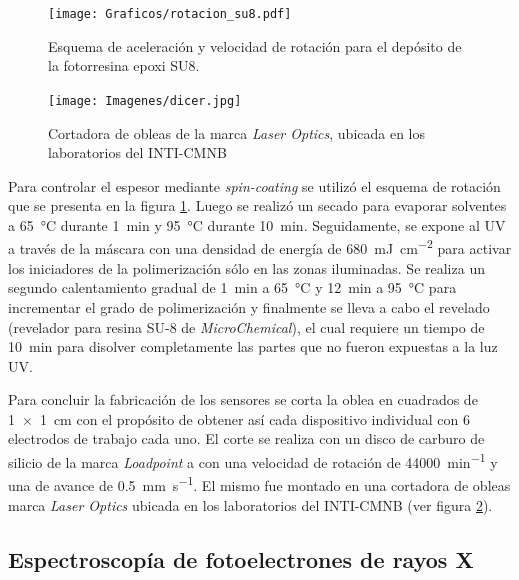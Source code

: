 					\begin{figure}[hb!]
			 		  \begin{center}
			 		  \texttt{[image: Graficos/rotacion\_su8.pdf]}
			 		  \caption[Parámetros de depósito para la resina epoxi]{Esquema de aceleración y velocidad de rotación para el depósito de la fotorresina epoxi SU8.}
			 		  \label{fig:spin-su8}
			 		  \vspace*{-2mm}
			 		  \end{center}
			 		  \end{figure}

			 		  \begin{figure}[bh!]
			 		  \begin{center}
			 		  \texttt{[image: Imagenes/dicer.jpg]}
			 		  \caption[Cortadora de obleas]{Cortadora de obleas de la marca \textit{Laser Optics}, ubicada en los laboratorios del INTI-CMNB}
			 		  \label{fig:dicer}
			 		  \end{center}
			 		  \end{figure}

		Para controlar el espesor mediante \textit{spin-coating} se utilizó el esquema de rotación que se presenta en la figura \ref{fig:spin-su8}. Luego se realizó un secado para evaporar solventes a \SI{65}{\celsius} durante \SI{1}{\minute} y \SI{95}{\celsius} durante \SI{10}{\minute}. Seguidamente, se expone al UV a través de la máscara con una densidad de energía de \SI{680}{mJ.cm^{-2}} para activar los iniciadores de la polimerización sólo en las zonas iluminadas. Se realiza un segundo calentamiento gradual de \SI{1}{\minute} a \SI{65}{\celsius} y \SI{12}{\minute} a \SI{95}{\celsius} para incrementar el grado de polimerización y finalmente se lleva a cabo el revelado (revelador para resina SU-8 de \textit{MicroChemical}), el cual requiere un tiempo de \SI{10}{\minute} para disolver completamente las partes que no fueron expuestas a la luz UV. 
		
		Para concluir la fabricación de los sensores se corta la oblea en cuadrados de \SI{1x1}{\cm} con el propósito de obtener así cada dispositivo individual con 6 electrodos de trabajo cada uno. El corte se realiza con un disco de carburo de silicio de la marca \textit{Loadpoint} a con una velocidad de rotación de \SI{44000}{\minute^{-1}} y una de avance de \SI{0.5}{\mm\per\second}. El mismo fue montado en una cortadora de obleas marca \textit{Laser Optics} ubicada en los laboratorios del INTI-CMNB (ver figura \ref{fig:dicer}).

	\subsection{Espectroscopía de fotoelectrones de rayos X}

